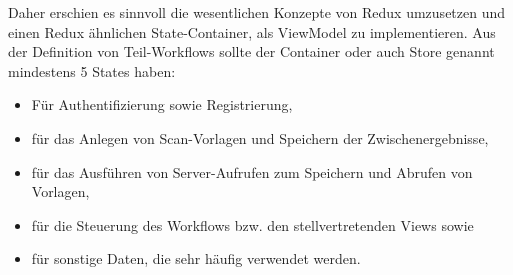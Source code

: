 \documentclass[notables, nomenclature, oneside, 150]{HSMW-Thesis}
\begin{document}
		Daher erschien es sinnvoll die wesentlichen Konzepte von Redux umzusetzen und einen Redux ähnlichen State-Container, als ViewModel zu implementieren. Aus der Definition von Teil-Workflows sollte der Container oder auch Store genannt mindestens 5 States haben: 
		\vspace{-5mm}
		\begin{itemize}
			\item Für Authentifizierung sowie Registrierung,
			\item für das Anlegen von Scan-Vorlagen und Speichern der Zwischenergebnisse,
			\item für das Ausführen von Server-Aufrufen zum Speichern und Abrufen von Vorlagen, 
			\item für die Steuerung des Workflows bzw. den stellvertretenden Views sowie
			\item für sonstige Daten, die sehr häufig verwendet werden.
		\end{itemize}
		
\end{document}
